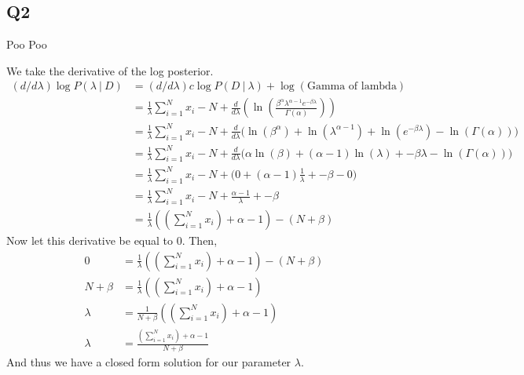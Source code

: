 \documentclass{article}
\theoremstyle{definition}
\begin{document}
    \subsection{Q2}
        \begin{mdframed}[]
            Poo Poo
        \end{mdframed}
        We take the derivative of the log posterior.
        \begin{align*}
            (d/d\lambda) \log P(\lambda \ | \ D) &= (d / d\lambda) c\log P(D \ | \ \lambda) + \log \left(\text{Gamma of lambda}\right) \\
            &= \frac{1}{\lambda}\sum_{i=1}^N x_i - N + \frac{d}{d\lambda }\left( \ln \left( \frac{\beta^\alpha \lambda^{\alpha - 1}e^{-\beta\lambda}}{\Gamma(\alpha)}\right) \right) \\
            &= \frac{1}{\lambda}\sum_{i=1}^N x_i - N + \frac{d}{d\lambda }\bigg( 
                \ln(\beta^\alpha) + \ln(\lambda^{\alpha-1}) + \ln(e^{-\beta\lambda}) - \ln(\Gamma(\alpha))
            \bigg)\\
            &= \frac{1}{\lambda}\sum_{i=1}^N x_i - N + \frac{d}{d\lambda }\bigg( 
                \alpha \ln(\beta) + (\alpha - 1)\ln(\lambda) + -\beta\lambda - \ln(\Gamma(\alpha))
            \bigg)\\
            &= \frac{1}{\lambda}\sum_{i=1}^N x_i - N + \bigg( 
                0 + (\alpha - 1)\frac{1}{\lambda} + -\beta - 0
            \bigg) \\
            &= \frac{1}{\lambda}\sum_{i=1}^N x_i - N + \frac{\alpha - 1}{\lambda} + -\beta \\
            &= \frac{1}{\lambda} \left( 
                \left(\sum_{i=1}^N x_i\right)  + \alpha - 1 
            \right)
            - (N + \beta)
        \end{align*}
        Now let this derivative be equal to 0. Then,
        \begin{align*}
            0 & = \frac{1}{\lambda} \left( 
                \left(\sum_{i=1}^N x_i\right)  + \alpha - 1 
            \right)
            - (N + \beta) \\
            N + \beta &= \frac{1}{\lambda} \left( 
                \left(\sum_{i=1}^N x_i\right)  + \alpha - 1 
            \right) \\
            \lambda &= \frac{1}{N + \beta} \left( 
                \left(\sum_{i=1}^N x_i\right)  + \alpha - 1 
            \right) \\
            \lambda &= \frac{\left(\sum_{i=1}^N x_i\right) + \alpha - 1}{N + \beta}
        \end{align*}
        And thus we have a closed form solution for our parameter $\lambda$.
\end{document}

